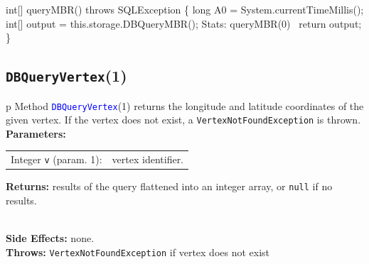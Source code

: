 \nwenddocs{}\endmoddef{}
int[] queryMBR() throws SQLException \{
  long A0 = System.currentTimeMillis();
  int[] output = this.storage.DBQueryMBR();
  \LA{}Stats: queryMBR(0)~{\nwtagstyle{}}\RA{}
  return output;
\}
\eatline
{}\nwendcode{}\nwdocspar
\subsection{\texttt{DBQueryVertex}(1)}
\begin{tabular}{p{\textwidth}}
\toprule
{}
Method \textcolor{blue}{{\tt{}\protect{}DBQueryVertex}}(1) returns the longitude and
latitude coordinates of the given vertex. If the vertex does not exist,
a {\tt{}VertexNotFoundException} is thrown.\\
\midrule
\textbf{Parameters:} \\
\begin{tabular}{lp{116mm}}
Integer {\tt{}v} (param. 1):&vertex identifier.
\end{tabular}
\textbf{Returns:} results of the query flattened into an integer array, or
{\tt{}null} if no results.

\\
\textbf{Side Effects:} none.\\
\textbf{Throws:} {\tt{}VertexNotFoundException} if vertex does not exist\\
\bottomrule
\end{tabular}
\nwenddocs{}\endmoddef{}
